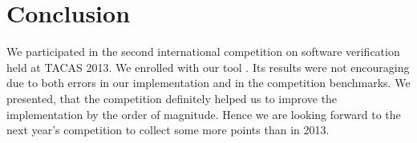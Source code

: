 

\section{Conclusion}\label{sec:svcomp_conclusion}
We participated in the second international competition on software
verification held at TACAS 2013. We enrolled with our tool \symbio. Its
results were not encouraging due to both errors in our implementation and in
the competition benchmarks. We presented, that the competition definitely
helped us to improve the implementation by the order of magnitude. Hence we
are looking forward to the next year's competition to collect some more points
than in 2013.

